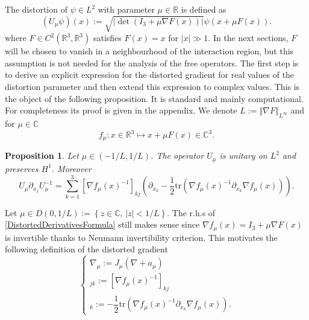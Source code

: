 \documentclass[a4paper, 12pt]{amsart}
\numberwithin{equation}{section}
\newtheorem{proposition}{Proposition}[section]
\newcommand{\C}{\mathbb{C}} %
\newcommand{\R}{\mathbb{R}} %
\newcommand{\tr}{\mathrm{tr}} %
\newcommand{\lp}{\left(} %
\newcommand{\rp}{\right)} %
\newcommand{\lb}{\left[} %
\newcommand{\rb}{\right]} %
\newcommand{\lcb}{\left\lbrace} %
\newcommand{\rcb}{\right\rbrace} %
\newcommand{\lv}{\left\vert} %
\newcommand{\rv}{\right\vert} %
\newcommand{\lV}{\left\Vert} %
\newcommand{\rV}{\right\Vert} %
\begin{document}
The distortion of $\psi\in L^2$ with parameter $\mu\in\R$ is defined as
\begin{equation*}\label{Distortion}
    (U_\mu\psi)(x):=\sqrt{\lv\det(I_3+\mu \nabla F(x))\rv}\psi(x+\mu F(x)).
\end{equation*}
where $F\in C^2(\R^3,\R^3)$ satisfies $F(x)=x$ for $\lv x\rv\gg 1$. In the next sections, $F$ will be chosen to vanish in a neighbourhood of the interaction region, but this assumption is not needed for the analysis of the free operators. The first step is to derive an explicit expression for the distorted gradient for real values of the distortion parameter and then extend this expression to complex values. This is the object of the following proposition. It is standard \cite{Hu86} and mainly computational. For completeness its proof is given in the appendix. We denote $L:=\lV \nabla F\rV_{L^\infty}$ and for $\mu\in\C$
\begin{equation*}\label{Diffeo}
    f_\mu:x\in\R^3\mapsto x+\mu F(x)\in\C^3.
\end{equation*}

\begin{proposition}\label{DistortedDerivatives}
    Let $\mu\in(-1/L,1/L)$. The operator $U_\mu$ is unitary on $L^2$ and preserves $H^1$. Moreover
    \begin{equation}\label{DistortedDerivativesFormula}
        U_\mu \partial_{x_j}U_\mu^{-1}=\sum_{k=1}^3\lb \nabla f_\mu(x)^{-1}\rb_{kj}\lp \partial_{x_k}-\frac{1}{2}\tr(\nabla f_\mu(x)^{-1}\partial_{x_k}\nabla f_\mu(x))\rp.
    \end{equation}
\end{proposition}

\noindent Let $\mu\in D(0,1/L):=\lcb z\in\C\mbox{, }\lv z\rv<1/L\rcb$. The r.h.s of \eqref{DistortedDerivativesFormula} still makes sense since $\nabla f_\mu(x)=I_3+\mu \nabla F(x)$ is invertible thanks to Neumann invertibility criterion. This motivates the following definition of the distorted gradient
\begin{equation*}\label{DistortedGradient}
    \left\{
    \begin{array}{ll}
        \nabla_\mu:=J_\mu(\nabla+a_\mu)\\
        
        [J_\mu(x)]_{jk}:=[\nabla f_\mu(x)^{-1}]_{kj}\\
        
        [a_\mu(x)]_k:=-\dfrac{1}{2}\tr(\nabla f_\mu(x)^{-1}\partial_{x_k}\nabla f_\mu(x)).
    \end{array}
    \right.
\end{equation*}
\end{document}
